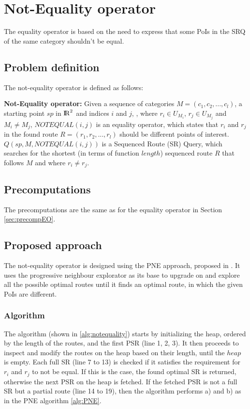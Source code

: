 \section{Not-Equality operator}
The equality operator is based on the need to express that some PoIs in the SRQ of the same category shouldn't be equal.

\subsection{Problem definition} 
\label{sec:problemNEO}
The not-equality operator is defined as follows: \newline

\textbf{Not-Equality operator:} Given a sequence of categories $M = (c_1, c_2, ..., c_l)$, a starting point $sp$ in ${\rm I\!R}^2$ and indices $i$ and $j$, , where $r_i \in U_{M_{i}}$, $r_j \in U_{M_{j}}$ and $M_i \neq M_j$, $NOTEQUAL(i, j)$ is an equality operator, which states that $r_i$ and $r_j$ in the found route $R = (r_1, r_2, ..., r_l)$ should be different points of interest.
$Q(sp, M, NOTEQUAL(i, j))$ is a Sequenced Route (SR) Query, which searches for the shortest (in terms of function $length$) sequenced route $R$ that follows $M$ and where $r_i \neq r_j$.

\subsection{Precomputations} 
\label{sec:precompNEO}
The precomputations are the same as for the equality operator in Section \ref{sec:precompEO}.

\subsection{Proposed approach} 
\label{sec:approachNEO}
The not-equality operator is designed using the PNE approach, proposed in \cite{OSR}. It uses the progressive neighbour explorator as its base to upgrade on and explore all the possible optimal routes until it finds an optimal route, in which the given PoIs are different.

\subsubsection{Algorithm}
\label{sec:algortihmNEO}
The algorithm (shown in \ref{alg:notequality}) starts by initializing the heap, ordered by the length of the routes, and the first PSR (line 1, 2, 3). It then proceeds to inspect and modify the routes on the heap based on their length, until the $heap$ is empty. Each full SR (line 7 to 13) is checked if it satisfies the requirement for $r_i$ and $r_j$ to not be equal. If this is the case, the found optimal SR is returned, otherwise the next PSR on the heap is fetched. If the fetched PSR is not a full SR but a partial route (line 14 to 19), then the algorithm performs a) and b) as in the PNE algorithm \ref{alg:PNE}.

